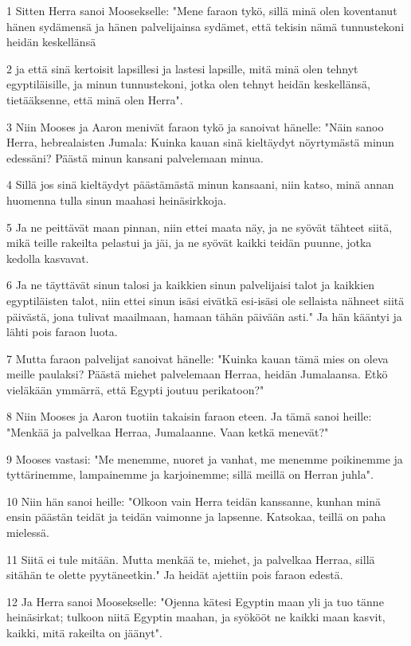 \par 1 Sitten Herra sanoi Moosekselle: "Mene faraon tykö, sillä minä olen koventanut hänen sydämensä ja hänen palvelijainsa sydämet, että tekisin nämä tunnustekoni heidän keskellänsä
\par 2 ja että sinä kertoisit lapsillesi ja lastesi lapsille, mitä minä olen tehnyt egyptiläisille, ja minun tunnustekoni, jotka olen tehnyt heidän keskellänsä, tietääksenne, että minä olen Herra".
\par 3 Niin Mooses ja Aaron menivät faraon tykö ja sanoivat hänelle: "Näin sanoo Herra, hebrealaisten Jumala: Kuinka kauan sinä kieltäydyt nöyrtymästä minun edessäni? Päästä minun kansani palvelemaan minua.
\par 4 Sillä jos sinä kieltäydyt päästämästä minun kansaani, niin katso, minä annan huomenna tulla sinun maahasi heinäsirkkoja.
\par 5 Ja ne peittävät maan pinnan, niin ettei maata näy, ja ne syövät tähteet siitä, mikä teille rakeilta pelastui ja jäi, ja ne syövät kaikki teidän puunne, jotka kedolla kasvavat.
\par 6 Ja ne täyttävät sinun talosi ja kaikkien sinun palvelijaisi talot ja kaikkien egyptiläisten talot, niin ettei sinun isäsi eivätkä esi-isäsi ole sellaista nähneet siitä päivästä, jona tulivat maailmaan, hamaan tähän päivään asti." Ja hän kääntyi ja lähti pois faraon luota.
\par 7 Mutta faraon palvelijat sanoivat hänelle: "Kuinka kauan tämä mies on oleva meille paulaksi? Päästä miehet palvelemaan Herraa, heidän Jumalaansa. Etkö vieläkään ymmärrä, että Egypti joutuu perikatoon?"
\par 8 Niin Mooses ja Aaron tuotiin takaisin faraon eteen. Ja tämä sanoi heille: "Menkää ja palvelkaa Herraa, Jumalaanne. Vaan ketkä menevät?"
\par 9 Mooses vastasi: "Me menemme, nuoret ja vanhat, me menemme poikinemme ja tyttärinemme, lampainemme ja karjoinemme; sillä meillä on Herran juhla".
\par 10 Niin hän sanoi heille: "Olkoon vain Herra teidän kanssanne, kunhan minä ensin päästän teidät ja teidän vaimonne ja lapsenne. Katsokaa, teillä on paha mielessä.
\par 11 Siitä ei tule mitään. Mutta menkää te, miehet, ja palvelkaa Herraa, sillä sitähän te olette pyytäneetkin." Ja heidät ajettiin pois faraon edestä.
\par 12 Ja Herra sanoi Moosekselle: "Ojenna kätesi Egyptin maan yli ja tuo tänne heinäsirkat; tulkoon niitä Egyptin maahan, ja syökööt ne kaikki maan kasvit, kaikki, mitä rakeilta on jäänyt".
